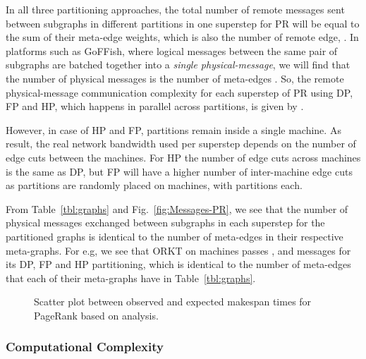 \documentclass[10pt,conference, compsocconf]{IEEEtran}
\begin{document}
In all three partitioning approaches, the total number of remote messages sent between subgraphs in different partitions in one superstep for PR will be equal to the sum of their meta-edge weights, which is also the number of remote edge, . In platforms such as GoFFish, where logical messages between the same pair of subgraphs are batched together into a \emph{single physical-message}, we will find that the number of physical messages is the number of meta-edges . So, the remote physical-message communication complexity for each superstep of PR using DP, FP and HP, which happens in parallel across  partitions, is given by .

However, in case of HP and FP,  partitions remain inside a single machine. As result, the real network bandwidth used per superstep depends on the number of edge cuts between the machines. For HP the number of edge cuts across machines is the same as DP, but FP will have a higher number of inter-machine edge cuts as  partitions are randomly placed on  machines, with  partitions each.

From Table~\ref{tbl:graphs} and Fig.~\ref{fig:Messages-PR}, we see that the number of physical messages exchanged between subgraphs in each superstep for the partitioned graphs is identical to the number of meta-edges in their respective meta-graphs. For e.g, we see that ORKT on  machines passes ,  and  messages for its DP, FP and HP partitioning, which is identical to the number of meta-edges that each of their meta-graphs have in Table~\ref{tbl:graphs}.







\begin{figure*}[t!]
\centering {}
\caption{Scatter plot between observed and expected makespan times for PageRank based on analysis.}
\label{fig:pr:makespan}
\vspace{-0.1in}
\end{figure*}

\subsubsection{Computational Complexity}
\end{document}
